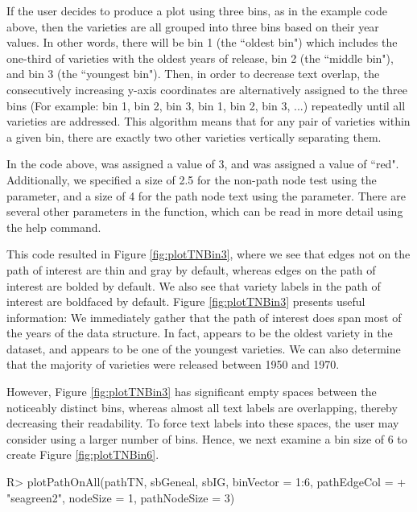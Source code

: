 \documentclass[article,shortnames]{jss}
\begin{document}
If the user decides to produce a plot using three bins, as in the example code above, then the varieties are all grouped into three bins based on their year values. In other words, there will be bin 1 (the ``oldest bin") which includes the one-third of varieties with the oldest years of release, bin 2 (the ``middle bin"), and bin 3 (the ``youngest bin"). Then, in order to decrease text overlap, the consecutively increasing y-axis coordinates are alternatively assigned to the three bins (For example: bin 1, bin 2, bin 3, bin 1, bin 2, bin 3, ...) repeatedly until all varieties are addressed. This algorithm means that for any pair of varieties within a given bin, there are exactly two other varieties vertically separating them.

In the code above,  was assigned a value of 3, and  was assigned a value of ``red". Additionally, we specified a size of 2.5 for the non-path node test using the  parameter, and a size of 4 for the path node text using the  parameter. There are several other parameters in the  function, which can be read in more detail using the help command.

This code resulted in Figure \ref{fig:plotTNBin3}, where we see that edges not on the path of interest are thin and gray by default, whereas edges on the path of interest are bolded by default. We also see that variety labels in the path of interest are boldfaced by default. Figure \ref{fig:plotTNBin3} presents useful information: We immediately gather that the path of interest does span most of the years of the data structure. In fact,  appears to be the oldest variety in the dataset, and  appears to be one of the youngest varieties. We can also determine that the majority of varieties were released between 1950 and 1970.

However, Figure \ref{fig:plotTNBin3} has significant empty spaces between the noticeably distinct bins, whereas almost all text labels are overlapping, thereby decreasing their readability. To force text labels into these spaces, the user may consider using a larger number of bins. Hence, we next examine a bin size of 6 to create Figure \ref{fig:plotTNBin6}.

\begin{Code}
R> plotPathOnAll(pathTN, sbGeneal, sbIG, binVector = 1:6, pathEdgeCol =
+    "seagreen2", nodeSize = 1, pathNodeSize = 3)
\end{Code}
\end{document}
